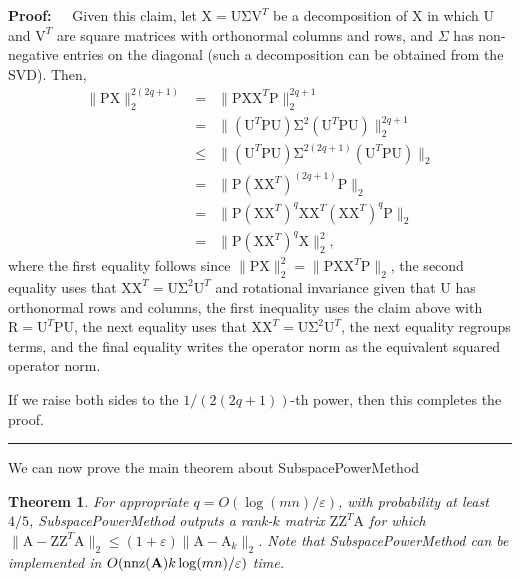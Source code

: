 \documentclass[11pt]{article}
\newtheorem{theorem}{Theorem}
\newenvironment{proof}{\begin{trivlist} \item {\bf Proof:~~}}
  {\qed\end{trivlist}}
\newcommand{\mat}[1]{{\ensuremath{\bm{\mathrm{#1}}}}}
\def\matA{\mat{A}}
\def\matP{\mat{P}}
\def\matR{\mat{R}}
\def\matU{\mat{U}}
\def\matV{\mat{V}}
\def\matX{\mat{X}}
\def\matZ{\mat{Z}}
\def\nnz{{ \rm nnz }}
\def\qed{\hfill\rule{2mm}{2mm}}
\newcommand{\eps}{\varepsilon}
\begin{document}
\begin{proof}
Given this claim, let $\matX = \matU \mat\Sigma \matV^T$ be a decomposition of $\matX$
in which $\matU$ and $\matV^T$ are square matrices with orthonormal columns and rows, 
and $\Sigma$ has non-negative entries on the diagonal (such a decomposition can be obtained
from the SVD). Then,
\begin{eqnarray*}
\|\matP\matX\|_2^{2(2q+1)} & = & \|\matP \matX\matX^T \matP\|_2^{2q+1}\\
& = & \|(\matU^T \matP \matU) \mat\Sigma^2 (\matU^T \matP \matU)\|_2^{2q+1}\\
& \leq & \|(\matU^T \matP \matU) \mat\Sigma^{2(2q+1)} (\matU^T \matP \matU)\|_2\\
& = & \|\matP (\matX\matX^T)^{(2q+1)}\matP\|_2 \\
& = & \|\matP(\matX\matX^T)^q \matX \matX^T (\matX\matX^T)^q \matP\|_2\\
& = & \|\matP(\matX\matX^T)^q \matX\|_2^2,
\end{eqnarray*}
where the first equality follows since $\|\matP\matX\|_2^2 = \|\matP\matX\matX^T\matP\|_2$,
the second equality uses that $\matX\matX^T = \matU \mat\Sigma^2 \matU^T$ and rotational
invariance given that $\matU$ has orthonormal rows and columns, the first inequality
uses the claim
above with $\matR = \matU^T \matP \matU$, the next equality uses that $\matX\matX^T =
\matU \mat\Sigma^2 \matU^T$, the next equality regroups terms, and the final equality
writes the operator norm as the equivalent squared operator norm. 

If we raise both sides to the $1/(2(2q+1))$-th power, then this completes the proof. 
\end{proof}
We can now prove the main theorem about {\sf SubspacePowerMethod}
\begin{theorem}\label{thm:tropp}
For appropriate $q = O(\log(mn)/\eps)$, 
with probability at least $4/5$, {\sf SubspacePowerMethod} outputs a rank-$k$ matrix $\matZ\matZ^T \matA$ for which
$\|\matA-\matZ\matZ^T\matA\|_2 \leq (1+\eps)\|\matA-\matA_k\|_2$.
Note that {\sf SubspacePowerMethod} can be implemented in $O(\nnz(\matA)k \log(mn)/\eps)$ time. 
\end{theorem}
\end{document}

